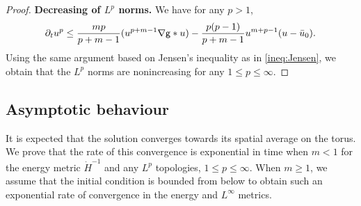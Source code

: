 \documentclass[11pt]{article}
\numberwithin{equation}{section} %
\newcommand{\p}{{\partial}}
\newcommand{\g}{{\mathsf{g}}}
\let\div\relax
\DeclareMathOperator{\div}{\mathsf{div}}
\def\nab{\nabla}
\begin{document}
\begin{proof}
    \bigbreak
    \textbf{Decreasing of $L^p$ norms.}
    We have for any $p > 1$,
    \begin{equation*}
        \p_t u^p \le \frac{mp}{p+m-1}\div (u^{p+m-1}\nab\g\ast u) -\frac{p(p-1)}{p+m-1} u^{m+p-1}(u-\bar u_0).
    \end{equation*}
    Using the same argument based on Jensen's inequality as in \eqref{ineq:Jensen}, we obtain that the $L^p$ norms are nonincreasing for any $1\le p\le \infty$.

\end{proof}



\subsection{Asymptotic behaviour}

It is expected that the solution converges towards its spatial average on the torus. We prove that the rate of this convergence is exponential in time when $m<1$ for the energy metric $\dot H^{-1}$ and any $L^p$ topologies, $1\le p\le \infty$. When $m\ge 1$, we assume that the initial condition is bounded from below to obtain such an exponential rate of convergence in the energy and $L^\infty$ metrics. 
\end{document}
